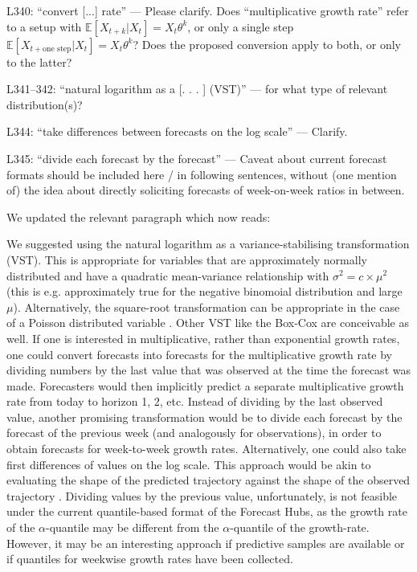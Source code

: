 \documentclass{article}
\newcommand{\black}{\color{black}}
\newcommand{\blue}{\color{blue}}
\newcommand{\indented}{\setlength{\leftskip}{1cm}}
\newcommand{\notindented}{\setlength{\leftskip}{0cm}}
\begin{document}
\notindented

\blue
L340: “convert [...] rate” — Please clarify. Does “multiplicative growth rate” refer to a setup with $\mathbb{E}[X_{t+k} | X_t] = X_t \theta^k$, or only a single step $\mathbb{E}[X_{t+\text{one step}} | X_t] = X_t \theta^k$? Does the proposed conversion apply to both, or only to the latter?

\blue
L341–342: “natural logarithm as a [. . . ] (VST)” — for what type of relevant distribution(s)?

\blue
L344: “take differences between forecasts on the log scale” — Clarify.

L345: “divide each forecast by the forecast” — Caveat about current forecast formats should be included here / in following sentences, without (one mention of) the idea about directly soliciting forecasts of week-on-week ratios in between.

\black
We updated the relevant paragraph which now reads:

\indented

We suggested using the natural logarithm as a variance-stabilising transformation (VST). This is appropriate for variables that are approximately normally distributed and have a quadratic mean-variance relationship with $\sigma^2 = c \times \mu^2$ (this is e.g. approximately true for the negative binomoial distribution and large $\mu$). Alternatively, the square-root transformation can be appropriate in the case of a Poisson distributed variable \citep{dunnGeneralizedLinearModels2018}. Other VST like the Box-Cox \citep{boxAnalysisTransformations1964} are conceivable as well.
If one is interested in multiplicative, rather than exponential growth rates, one could convert forecasts into forecasts for the multiplicative growth rate by dividing numbers by the last value that was observed at the time the forecast was made. Forecasters would then implicitly predict a separate multiplicative growth rate from today to horizon 1, 2, etc. 
Instead of dividing by the last observed value, another promising transformation would be to divide each forecast by the forecast of the previous week (and analogously for observations), in order to obtain forecasts for week-to-week growth rates. Alternatively, one could also take first differences of values on the log scale. This approach would be akin to evaluating the shape of the predicted trajectory against the shape of the observed trajectory \citep[for a different approach to evaluating the shape of a forecast, see][]{srivastavaShapebasedEvaluationEpidemic2022}. Dividing values by the previous value, unfortunately, is not feasible under the current quantile-based format of the Forecast Hubs, as the growth rate of the $\alpha$-quantile may be different from the $\alpha$-quantile of the growth-rate. However, it may be an interesting approach if predictive samples are available or if quantiles for weekwise growth rates have been collected. 
\end{document}
